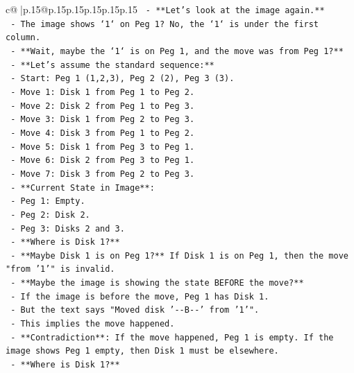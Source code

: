 \documentclass{article}
\begin{document}
{\begin{supertabular}{c@{$\;$}|p{.15\linewidth}@{}p{.15\linewidth}p{.15\linewidth}p{.15\linewidth}p{.15\linewidth}p{.15\linewidth}}
{{{\texttt{          {-} **Let's look at the image again.**} \\
\texttt{          {-} The image shows `1` on Peg 1? No, the `1` is under the first column.} \\
\texttt{          {-} **Wait, maybe the `1` is on Peg 1, and the move was from Peg 1?**} \\
\texttt{          {-} **Let's assume the standard sequence:**} \\
\texttt{            {-} Start: Peg 1 (1,2,3), Peg 2 (2), Peg 3 (3).} \\
\texttt{            {-} Move 1: Disk 1 from Peg 1 to Peg 2.} \\
\texttt{            {-} Move 2: Disk 2 from Peg 1 to Peg 3.} \\
\texttt{            {-} Move 3: Disk 1 from Peg 2 to Peg 3.} \\
\texttt{            {-} Move 4: Disk 3 from Peg 1 to Peg 2.} \\
\texttt{            {-} Move 5: Disk 1 from Peg 3 to Peg 1.} \\
\texttt{            {-} Move 6: Disk 2 from Peg 3 to Peg 1.} \\
\texttt{            {-} Move 7: Disk 3 from Peg 2 to Peg 3.} \\
\texttt{          {-} **Current State in Image**:} \\
\texttt{            {-} Peg 1: Empty.} \\
\texttt{            {-} Peg 2: Disk 2.} \\
\texttt{            {-} Peg 3: Disks 2 and 3.} \\
\texttt{            {-} **Where is Disk 1?**} \\
\texttt{            {-} **Maybe Disk 1 is on Peg 1?** If Disk 1 is on Peg 1, then the move "from '1'" is invalid.} \\
\texttt{            {-} **Maybe the image is showing the state BEFORE the move?**} \\
\texttt{              {-} If the image is before the move, Peg 1 has Disk 1.} \\
\texttt{              {-} But the text says "Moved disk '{-}{-}B{-}{-}' from '1'".} \\
\texttt{              {-} This implies the move happened.} \\
\texttt{              {-} **Contradiction**: If the move happened, Peg 1 is empty. If the image shows Peg 1 empty, then Disk 1 must be elsewhere.} \\
\texttt{              {-} **Where is Disk 1?**} \\
}}}
\end{supertabular}}
\end{document}
